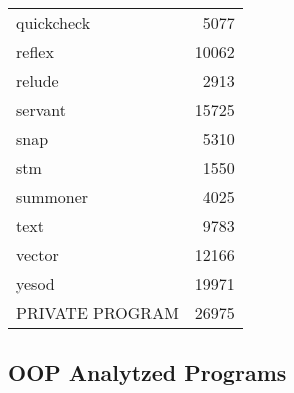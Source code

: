 \documentclass[12pt, a4paper]{article}
\begin{document}
\begin{longtable}[H]{l r}
        quickcheck & 5077 \\
        reflex & 10062 \\
        relude & 2913 \\
        servant & 15725 \\
        snap & 5310 \\
        stm & 1550 \\
        summoner & 4025 \\
        text & 9783 \\
        vector & 12166 \\
        yesod & 19971 \\
        PRIVATE PROGRAM & 26975
\end{longtable}

\subsection{OOP Analytzed Programs}
\end{document}
